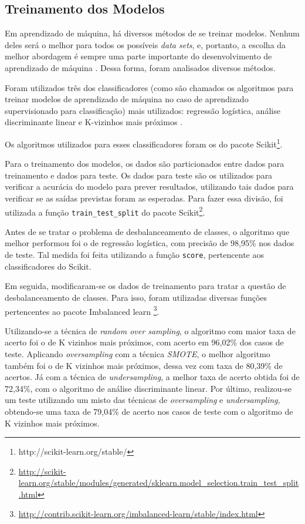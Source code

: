 		\subsection{Treinamento dos Modelos}

			Em aprendizado de máquina, há diversos métodos de se treinar modelos. Nenhum deles será o melhor para todos os possíveis \emph{data sets}, e, portanto, a escolha da melhor abordagem é sempre uma parte importante do desenvolvimento de aprendizado de máquina \cite{islr}. Dessa forma, foram analisados diversos métodos.

			Foram utilizados três dos classificadores (como são chamados os algoritmos para treinar modelos de aprendizado de máquina no caso de aprendizado supervisionado para classificação) mais utilizados: regressão logística, análise discriminante linear e K-vizinhos mais próximos \cite{islr}.

			Os algoritmos utilizados para esses classificadores foram os do pacote Scikit\footnote{http://scikit-learn.org/stable/}.

			Para o treinamento dos modelos, os dados são particionados entre dados para treinamento e dados para teste. Os dados para teste são os utilizados para verificar a acurácia do modelo para prever resultados, utilizando tais dados para verificar se as saídas previstas foram as esperadas. Para fazer essa divisão, foi utilizada a função \texttt{train\_test\_split} do pacote Scikit\footnote{\url{http://scikit-learn.org/stable/modules/generated/sklearn.model_selection.train_test_split.html}}.

			Antes de se tratar o problema de desbalanceamento de classes, o algoritmo que melhor performou foi o de regressão logística, com precisão de 98,95\% nos dados de teste. Tal medida foi feita utilizando a função \texttt{score}, pertencente aos classificadores do Scikit.

			Em seguida, modificaram-se os dados de treinamento para tratar a questão de desbalanceamento de classes. Para isso, foram utilizadas diversas funções pertencentes ao pacote Imbalanced learn \footnote{\url{http://contrib.scikit-learn.org/imbalanced-learn/stable/index.html}}.

			Utilizando-se a técnica de \emph{random over sampling}, o algoritmo com maior taxa de acerto foi o de K vizinhos mais próximos, com acerto em 96,02\% dos casos de teste. Aplicando \emph{oversampling} com a técnica \emph{SMOTE}, o melhor algoritmo também foi o de K vizinhos mais próximos, dessa vez com taxa de 80,39\% de acertos. Já com a técnica de \emph{undersampling}, a melhor taxa de acerto obtida foi de 72,34\%, com o algoritmo de análise discriminante linear. Por último, realizou-se um teste utilizando um misto das técnicas de \emph{oversampling} e \emph{undersampling}, obtendo-se uma taxa de 79,04\% de acerto nos casos de teste com o algoritmo de K vizinhos mais próximos.

